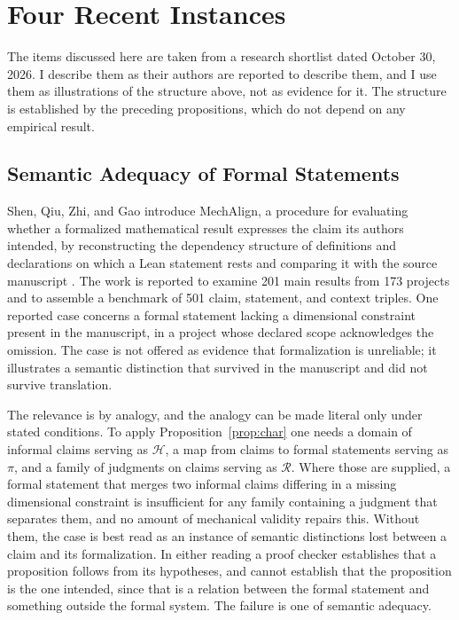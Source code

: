 \documentclass[11pt]{article}
\theoremstyle{remark}
\newcommand{\Hist}{\mathcal{H}}
\newcommand{\Rev}{\mathcal{R}}
\begin{document}
\section{Four Recent Instances}\label{sec:instances}

The items discussed here are taken from a research shortlist dated October 30, 2026. I describe them as their authors are reported to describe them, and I use them as illustrations of the structure above, not as evidence for it. The structure is established by the preceding propositions, which do not depend on any empirical result.

\subsection{Semantic Adequacy of Formal Statements}

Shen, Qiu, Zhi, and Gao introduce MechAlign, a procedure for evaluating whether a formalized mathematical result expresses the claim its authors intended, by reconstructing the dependency structure of definitions and declarations on which a Lean statement rests and comparing it with the source manuscript \cite{shen2026mechalign}. The work is reported to examine 201 main results from 173 projects and to assemble a benchmark of 501 claim, statement, and context triples. One reported case concerns a formal statement lacking a dimensional constraint present in the manuscript, in a project whose declared scope acknowledges the omission. The case is not offered as evidence that formalization is unreliable; it illustrates a semantic distinction that survived in the manuscript and did not survive translation.

The relevance is by analogy, and the analogy can be made literal only under stated conditions. To apply Proposition~\ref{prop:char} one needs a domain of informal claims serving as $\Hist$, a map from claims to formal statements serving as $\pi$, and a family of judgments on claims serving as $\Rev$. Where those are supplied, a formal statement that merges two informal claims differing in a missing dimensional constraint is insufficient for any family containing a judgment that separates them, and no amount of mechanical validity repairs this. Without them, the case is best read as an instance of semantic distinctions lost between a claim and its formalization. In either reading a proof checker establishes that a proposition follows from its hypotheses, and cannot establish that the proposition is the one intended, since that is a relation between the formal statement and something outside the formal system. The failure is one of semantic adequacy.
\end{document}
